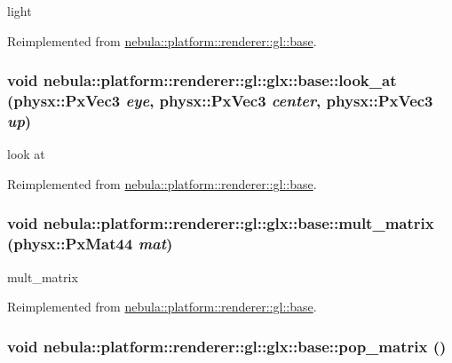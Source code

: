 light 

Reimplemented from \hyperlink{classnebula_1_1platform_1_1renderer_1_1gl_1_1base_a05d47dc08e518dca1f1f6940dd25b1d4}{nebula::platform::renderer::gl::base}.\hypertarget{classnebula_1_1platform_1_1renderer_1_1gl_1_1glx_1_1base_ac1e401ba57d7b5a09ba684529092ea38}{
\subsubsection[{look\_\-at}]{\setlength{\rightskip}{0pt plus 5cm}void nebula::platform::renderer::gl::glx::base::look\_\-at (physx::PxVec3 {\em eye}, \/  physx::PxVec3 {\em center}, \/  physx::PxVec3 {\em up})}}
\label{classnebula_1_1platform_1_1renderer_1_1gl_1_1glx_1_1base_ac1e401ba57d7b5a09ba684529092ea38}


look at 

Reimplemented from \hyperlink{classnebula_1_1platform_1_1renderer_1_1gl_1_1base_a9409d2f85fd5b8ceb9aa159f557a77c4}{nebula::platform::renderer::gl::base}.\hypertarget{classnebula_1_1platform_1_1renderer_1_1gl_1_1glx_1_1base_a3909d992dcbe8ef8af6e221633146c39}{
\subsubsection[{mult\_\-matrix}]{\setlength{\rightskip}{0pt plus 5cm}void nebula::platform::renderer::gl::glx::base::mult\_\-matrix (physx::PxMat44 {\em mat})}}
\label{classnebula_1_1platform_1_1renderer_1_1gl_1_1glx_1_1base_a3909d992dcbe8ef8af6e221633146c39}


mult\_\-matrix 

Reimplemented from \hyperlink{classnebula_1_1platform_1_1renderer_1_1gl_1_1base_a31fd2eab976e8d85e0d9ddcf9435b4e8}{nebula::platform::renderer::gl::base}.\hypertarget{classnebula_1_1platform_1_1renderer_1_1gl_1_1glx_1_1base_aa01b481132d930627aecfa43080c1527}{
\subsubsection[{pop\_\-matrix}]{\setlength{\rightskip}{0pt plus 5cm}void nebula::platform::renderer::gl::glx::base::pop\_\-matrix ()}}
\label{classnebula_1_1platform_1_1renderer_1_1gl_1_1glx_1_1base_aa01b481132d930627aecfa43080c1527}


